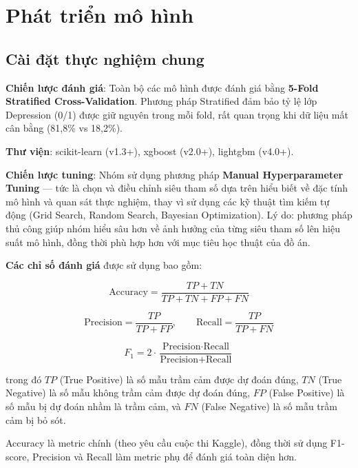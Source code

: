 \section{Phát triển mô hình}
\label{sec:model_dev}

\subsection{Cài đặt thực nghiệm chung}
\label{subsec:experiment_setup}

\textbf{Chiến lược đánh giá}: Toàn bộ các mô hình được đánh giá bằng \textbf{5-Fold Stratified Cross-Validation}. Phương pháp Stratified đảm bảo tỷ lệ lớp Depression (0/1) được giữ nguyên trong mỗi fold, rất quan trọng khi dữ liệu mất cân bằng (81,8\% vs 18,2\%).

\textbf{Thư viện}: scikit-learn (v1.3+), xgboost (v2.0+), lightgbm (v4.0+).

\textbf{Chiến lược tuning}: Nhóm sử dụng phương pháp \textbf{Manual Hyperparameter Tuning} --- tức là chọn và điều chỉnh siêu tham số dựa trên hiểu biết về đặc tính mô hình và quan sát thực nghiệm, thay vì sử dụng các kỹ thuật tìm kiếm tự động (Grid Search, Random Search, Bayesian Optimization). Lý do: phương pháp thủ công giúp nhóm hiểu sâu hơn về ảnh hưởng của từng siêu tham số lên hiệu suất mô hình, đồng thời phù hợp hơn với mục tiêu học thuật của đồ án.

\textbf{Các chỉ số đánh giá} được sử dụng bao gồm:

\begin{equation}
\text{Accuracy} = \frac{TP + TN}{TP + TN + FP + FN}
\label{eq:accuracy}
\end{equation}

\begin{equation}
\text{Precision} = \frac{TP}{TP + FP}, \qquad \text{Recall} = \frac{TP}{TP + FN}
\label{eq:prec_recall}
\end{equation}

\begin{equation}
F_1 = 2 \cdot \frac{\text{Precision} \cdot \text{Recall}}{\text{Precision} + \text{Recall}}
\label{eq:f1}
\end{equation}

trong đó $TP$ (True Positive) là số mẫu trầm cảm được dự đoán đúng, $TN$ (True Negative) là số mẫu không trầm cảm được dự đoán đúng, $FP$ (False Positive) là số mẫu bị dự đoán nhầm là trầm cảm, và $FN$ (False Negative) là số mẫu trầm cảm bị bỏ sót.

Accuracy là metric chính (theo yêu cầu cuộc thi Kaggle), đồng thời sử dụng F1-score, Precision và Recall làm metric phụ để đánh giá toàn diện hơn.

